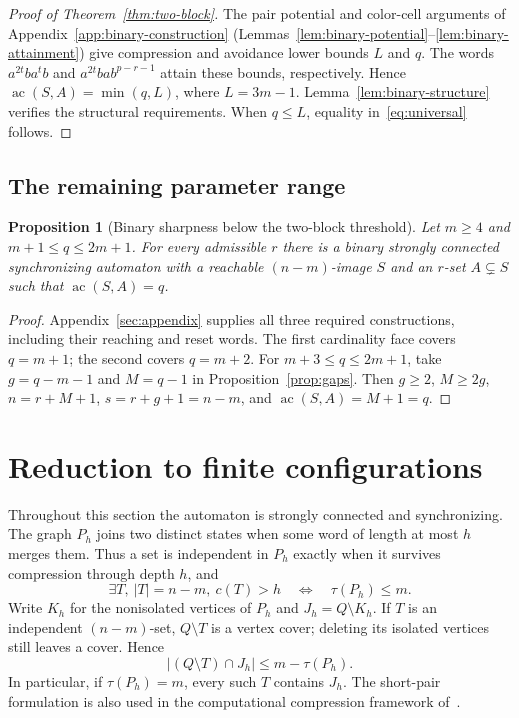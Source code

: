 \documentclass[11pt]{article}
\theoremstyle{definition}
\theoremstyle{plain}
\newtheorem{proposition}[theorem]{Proposition}
\newcommand{\ac}{\operatorname{ac}}
\begin{document}
\begin{proof}[Proof of Theorem~\ref{thm:two-block}]
The pair potential and color-cell arguments of
Appendix~\ref{app:binary-construction}
(Lemmas~\ref{lem:binary-potential}--\ref{lem:binary-attainment})
give compression and avoidance lower bounds $L$ and $q$. The words
$a^{2t}ba^tb$ and $a^{2t}bab^{p-r-1}$ attain these bounds, respectively.
Hence $\ac(S,A)=\min(q,L)$, where $L=3m-1$.
Lemma~\ref{lem:binary-structure} verifies the structural requirements.
When $q\le L$, equality in~\eqref{eq:universal} follows.
\end{proof}

\subsection{The remaining parameter range}
\begin{proposition}[Binary sharpness below the two-block threshold]\label{prop:smallq}
Let $m\ge4$ and $m+1\le q\le2m+1$. For every admissible $r$ there is a binary
strongly connected synchronizing automaton with a reachable $(n-m)$-image
$S$ and an $r$-set $A\subsetneq S$ such that $\ac(S,A)=q$.
\end{proposition}
\begin{proof}
Appendix~\ref{sec:appendix} supplies all three required constructions,
including their reaching and reset words.
The first cardinality face covers $q=m+1$; the second covers $q=m+2$.
For $m+3\le q\le2m+1$, take $g=q-m-1$ and $M=q-1$ in
Proposition~\ref{prop:gaps}. Then $g\ge2$, $M\ge2g$,
$n=r+M+1$, $s=r+g+1=n-m$, and $\ac(S,A)=M+1=q$.
\end{proof}
\section{Reduction to finite configurations}\label{sec:method}
Throughout this section the automaton is strongly connected and
synchronizing. The graph $P_h$ joins two distinct states when some word
of length at most $h$ merges them. Thus a set is independent in $P_h$
exactly when it survives compression through depth $h$, and
\begin{equation}\label{eq:cover}
 \exists T,\ |T|=n-m,\ c(T)>h
 \quad\Longleftrightarrow\quad \tau(P_h)\le m.
\end{equation}
Write $K_h$ for the nonisolated vertices of $P_h$ and
$J_h=Q\setminus K_h$. If $T$ is an independent $(n-m)$-set,
$Q\setminus T$ is a vertex cover; deleting its isolated vertices
still leaves a cover. Hence
\begin{equation}\label{eq:core-localization}
 |(Q\setminus T)\cap J_h|\le m-\tau(P_h).
\end{equation}
In particular, if $\tau(P_h)=m$, every such $T$ contains $J_h$.
The short-pair formulation is also used in the computational compression
framework of~\cite{kisielewicz2016}.
\end{document}

